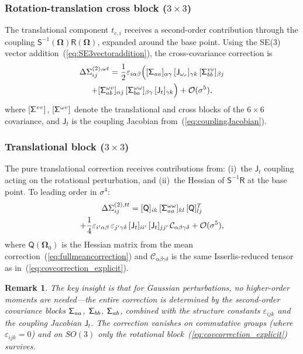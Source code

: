 \documentclass[journal]{IEEEtran}
\newcommand{\bfOmega}{\boldsymbol{\Omega}}
\newcommand{\sfSigma}[1]{\mathsf{\Sigma}_\mathnormal{#1}}
\newtheorem{remark}{Remark}
\begin{document}
\subsubsection{Rotation-translation cross block ($3\times 3$)}
The translational component $t_{c,i}$ receives a second-order 
contribution through the coupling 
$\mathsf{S}^{-1}(\bfOmega)\mathsf{R}(\bfOmega)$, 
expanded around the base point. Using the 
SE(3) vector addition~(\ref{eq:SE3vectoraddition}), 
the cross-covariance correction is
\begin{multline}
    \Delta\Sigma^{(2),\omega t}_{ij} = \frac{1}{2}
    \varepsilon_{i\alpha\beta}\Big(
    [\sfSigma{aa}]_{\alpha\gamma}\,
    [\mathsf{J}_{\omega_r}]_{\gamma k}\,
    [\sfSigma{bb}^{vv}]_{\beta j} \\
    + [\sfSigma{ab}^{\omega v}]_{\alpha j}\,
    [\sfSigma{ba}^{\omega\omega}]_{\beta\gamma}\,
    [\mathsf{J}_t]_{\gamma k}\Big)
    + \mathcal{O}(\sigma^5),
    \label{eq:covcorrection_rottrans}
\end{multline}
where $[\sfSigma{}^{vv}]$, $[\sfSigma{}^{\omega v}]$ 
denote the translational and cross blocks of the 
$6\times 6$ covariance, and $\mathsf{J}_t$ is the 
coupling Jacobian from~(\ref{eq:couplingJacobian}).

\subsubsection{Translational block ($3\times 3$)}
The pure translational correction receives contributions 
from: (i)~the $\mathsf{J}_t$ coupling acting on the 
rotational perturbation, and (ii)~the Hessian of 
$\mathsf{S}^{-1}\mathsf{R}$ at the base point. 
To leading order in $\sigma^4$:
\begin{multline}
    \Delta\Sigma^{(2),tt}_{ij} = 
    [\mathsf{Q}]_{ik}\,[\sfSigma{aa}^{\omega\omega}]_{kl}\,
    [\mathsf{Q}]^T_{lj} \\
    + \frac{1}{4}\varepsilon_{i'\alpha\beta}\,
    \varepsilon_{j'\gamma\delta}\,
    [\mathsf{J}_t]_{ii'}\,[\mathsf{J}_t]_{jj'}\,
    \mathcal{C}_{\alpha\beta\gamma\delta}
    + \mathcal{O}(\sigma^5),
    \label{eq:covcorrection_transtrans}
\end{multline}
where $\mathsf{Q}(\bfOmega_0)$ is the Hessian matrix from 
the mean correction~(\ref{eq:fullmeancorrection}) and 
$\mathcal{C}_{\alpha\beta\gamma\delta}$ is the same 
Isserlis-reduced tensor as in~(\ref{eq:covcorrection_explicit}).

\begin{remark}
The key insight is that for Gaussian perturbations, no 
higher-order moments are needed---the entire correction 
is determined by the second-order covariance blocks 
$\sfSigma{aa}$, $\sfSigma{bb}$, $\sfSigma{ab}$, 
combined with the structure constants $\varepsilon_{ijk}$ 
and the coupling Jacobian $\mathsf{J}_t$. The correction 
vanishes on commutative groups (where $\varepsilon_{ijk}=0$) 
and on $SO(3)$ only the rotational 
block~(\ref{eq:covcorrection_explicit}) survives.
\end{remark}
\end{document}
